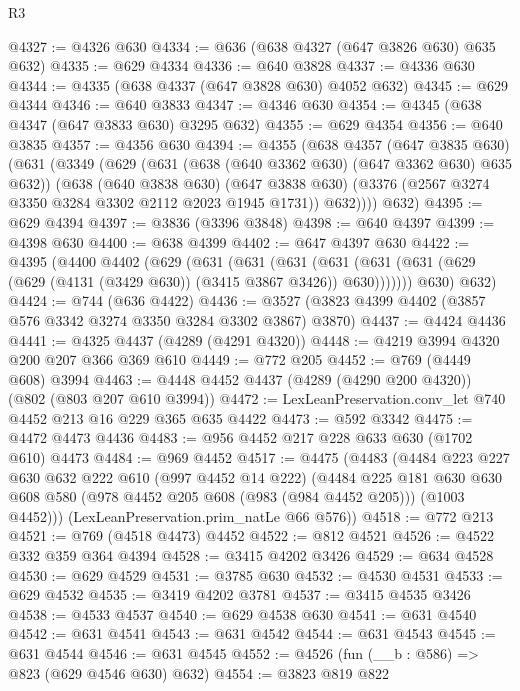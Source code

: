 \begin{lexlean}{R3}
\begin{coremodule}
@4327 := @4326 @630
@4334 := @636 (@638 @4327 (@647 @3826 @630) @635 @632)
@4335 := @629 @4334
@4336 := @640 @3828
@4337 := @4336 @630
@4344 := @4335 (@638 @4337 (@647 @3828 @630) @4052 @632)
@4345 := @629 @4344
@4346 := @640 @3833
@4347 := @4346 @630
@4354 := @4345 (@638 @4347 (@647 @3833 @630) @3295 @632)
@4355 := @629 @4354
@4356 := @640 @3835
@4357 := @4356 @630
@4394 := @4355
    (@638
      @4357
      (@647 @3835 @630)
      (@631
        (@3349
          (@629
            (@631 (@638 (@640 @3362 @630) (@647 @3362 @630) @635 @632))
            (@638
              (@640 @3838 @630)
              (@647 @3838 @630)
              (@3376 (@2567 @3274 @3350 @3284 @3302 @2112 @2023 @1945 @1731))
              @632))))
      @632)
@4395 := @629 @4394
@4397 := @3836 (@3396 @3848)
@4398 := @640 @4397
@4399 := @4398 @630
@4400 := @638 @4399
@4402 := @647 @4397 @630
@4422 := @4395
    (@4400
      @4402
      (@629
        (@631
          (@631
            (@631
              (@631 (@631 (@631 (@629 (@629 (@4131 (@3429 @630)) (@3415 @3867 @3426)) @630)))))))
        @630)
      @632)
@4424 := @744 (@636 @4422)
@4436 := @3527 (@3823 @4399 @4402 (@3857 @576 @3342 @3274 @3350 @3284 @3302 @3867) @3870)
@4437 := @4424 @4436
@4441 := @4325 @4437 (@4289 (@4291 @4320))
@4448 := @4219 @3994 @4320 @200 @207 @366 @369 @610
@4449 := @772 @205
@4452 := @769 (@4449 @608) @3994
@4463 := @4448 @4452 @4437 (@4289 (@4290 @200 @4320)) (@802 (@803 @207 @610 @3994))
@4472 := LexLeanPreservation.conv_let @740 @4452 @213 @16 @229 @365 @635 @4422
@4473 := @592 @3342
@4475 := @4472 @4473 @4436
@4483 := @956 @4452 @217 @228 @633 @630 (@1702 @610) @4473
@4484 := @969 @4452
@4517 := @4475
    (@4483
      (@4484
        @223
        @227
        @630
        @632
        @222
        @610
        (@997 @4452 @14 @222)
        (@4484
          @225
          @181
          @630
          @630
          @608
          @580
          (@978 @4452 @205 @608 (@983 (@984 @4452 @205)))
          (@1003 @4452)))
      (LexLeanPreservation.prim_natLe @66 @576))
@4518 := @772 @213
@4521 := @769 (@4518 @4473) @4452
@4522 := @812 @4521
@4526 := @4522 @332 @359 @364 @4394
@4528 := @3415 @4202 @3426
@4529 := @634 @4528
@4530 := @629 @4529
@4531 := @3785 @630
@4532 := @4530 @4531
@4533 := @629 @4532
@4535 := @3419 @4202 @3781
@4537 := @3415 @4535 @3426
@4538 := @4533 @4537
@4540 := @629 @4538 @630
@4541 := @631 @4540
@4542 := @631 @4541
@4543 := @631 @4542
@4544 := @631 @4543
@4545 := @631 @4544
@4546 := @631 @4545
@4552 := @4526 (fun (__b : @586) => @823 (@629 @4546 @630) @632)
@4554 := @3823 @819 @822

\end{coremodule}
\end{lexlean}
